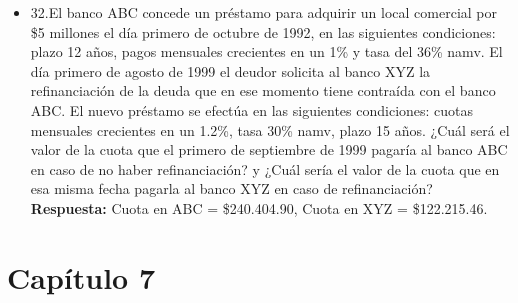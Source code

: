 \begin{itemize}
	\item 32.El banco ABC concede un préstamo para adquirir un local comercial por \$5 millones el día primero de octubre de 1992, en las siguientes condiciones: plazo 12 años, pagos mensuales crecientes en un 1\% y tasa del 36\% namv. El día primero de agosto de 1999 el deudor solicita al banco XYZ la refinanciación de la deuda que en ese momento tiene contraída con el banco ABC. El nuevo préstamo se efectúa en las siguientes condiciones: cuotas mensuales crecientes en un 1.2\%, tasa 30\% namv, plazo 15 años. ¿Cuál será el valor de la cuota que el primero de septiembre de 1999 pagaría al banco ABC en caso de no haber refinanciación? y ¿Cuál sería el valor de la cuota que en esa misma fecha pagarla al banco XYZ en caso de refinanciación?\\
	\textbf{Respuesta:} Cuota en ABC = \$240.404.90, \hspace{1,0cm} Cuota en XYZ = \$122.215.46.\\
	
\end{itemize}

\chapter*{Capítulo 7}




